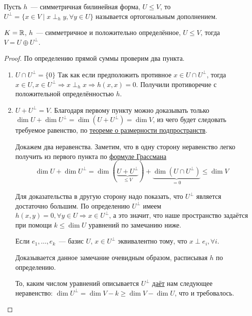 \begin{definition}
    Пусть $h$~--- симметричная билинейная форма, $U\le V$, то $U^{\perp} = 
    \{x\in V \mid  x\perp_h y, \forall y \in U \}$ называется ортогональным дополнением.
\end{definition}
\begin{theorem}
    $K = \mathbb{R}$, $h$~--- симметричное и положительно определённое, $U \le V$,
    тогда $V = U \oplus U^{\perp}$.
\end{theorem}
\begin{proof}\leavevmode
    По определению прямой суммы проверим два пункта.
    \begin{enumerate}
        \item
        $U\cap U^{\perp} = \{0\}$
        Так как если предположить противное $x\in U \cap U^\perp$, тогда 
        $x \in U, x \in U^\perp \Rightarrow x \perp_{h} x \Rightarrow 
        h(x, x) = 0$. Получили противоречие с положительной определённостью $h$.
        \item 
        $U + U^\perp = V$. Благодаря первому пункту можно доказывать только
        $\dim U + \dim U^{\perp} = \dim (U + U^\perp) = \dim V$,
        из чего будет следовать требуемое равенство, по 
        \hyperref[thm:О размерности подпространств]{теореме о размерности подпространств}.

        Докажем два неравенства. Заметим, что в одну сторону неравенство легко получить
        из первого пункта по \hyperref[thm:Формула Грассмана]{формуле Грассмана} 
        \[
             \dim U + \dim U^{\perp} = \dim (\underbrace{U + U^\perp}_{\le V}) + \underbrace{\dim (U \cap U^\perp)}_{=0} \le \dim V
        \]

        Для доказательства в другую сторону надо показать, что $U^{\perp}$ является достаточно
        большим. По определению $U^\perp$ имеем $h(x, y) = 0, \forall y\in U \Rightarrow x\in U^\perp$, а это значит, что наше
        пространство задаётся при помощи $k \le \dim U$ уравнений по замечанию ниже.

        \begin{remark}
            Если $e_1,\dots, e_k$~--- базис $U$, 
            $x\in U^{\perp}$ эквивалентно тому, что $x \perp e_i, \forall i$.
        \end{remark}
        Доказывается данное замечание очевидным образом, расписывая $h$ по определению.

        То, каким числом уравнений описывается $U^\perp$ 
        \hyperref[stm:О пространстве решений СЛУ]{даёт} нам следующее неравенство:
        $\dim U^{\perp} = \dim V - k \ge \dim V - \dim U$, что и требовалось.
    \end{enumerate}
\end{proof}
